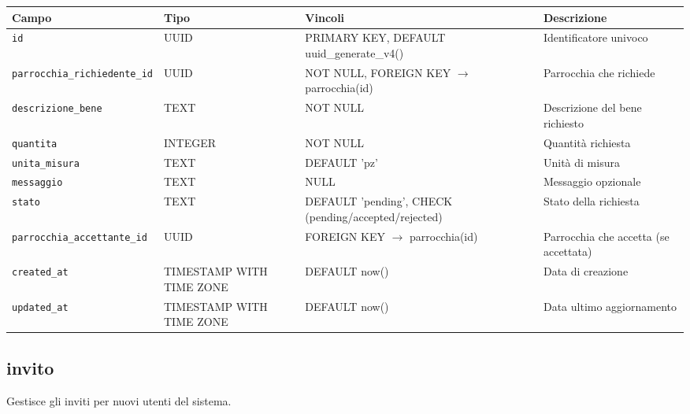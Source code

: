 \documentclass[11pt,a4paper]{article}
\begin{document}
\begin{longtable}{p{3cm}p{3cm}p{4cm}p{5cm}}
\toprule
\textbf{Campo} & \textbf{Tipo} & \textbf{Vincoli} & \textbf{Descrizione} \\
\midrule
\texttt{id} & UUID & PRIMARY KEY, DEFAULT uuid\_generate\_v4() & Identificatore univoco \\
\texttt{parrocchia\_richiedente\_id} & UUID & NOT NULL, FOREIGN KEY $\rightarrow$ parrocchia(id) & Parrocchia che richiede \\
\texttt{descrizione\_bene} & TEXT & NOT NULL & Descrizione del bene richiesto \\
\texttt{quantita} & INTEGER & NOT NULL & Quantità richiesta \\
\texttt{unita\_misura} & TEXT & DEFAULT 'pz' & Unità di misura \\
\texttt{messaggio} & TEXT & NULL & Messaggio opzionale \\
\texttt{stato} & TEXT & DEFAULT 'pending', CHECK (pending/accepted/rejected) & Stato della richiesta \\
\texttt{parrocchia\_accettante\_id} & UUID & FOREIGN KEY $\rightarrow$ parrocchia(id) & Parrocchia che accetta (se accettata) \\
\texttt{created\_at} & TIMESTAMP WITH TIME ZONE & DEFAULT now() & Data di creazione \\
\texttt{updated\_at} & TIMESTAMP WITH TIME ZONE & DEFAULT now() & Data ultimo aggiornamento \\
\end{longtable}

\subsection{invito}
Gestisce gli inviti per nuovi utenti del sistema.
\end{document}
